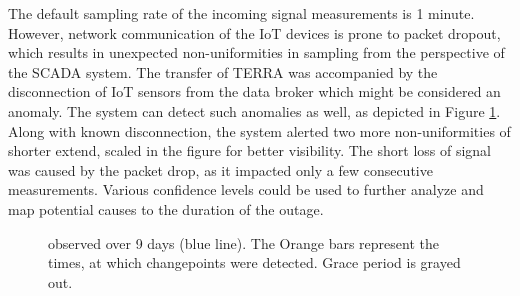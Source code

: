The default sampling rate of the incoming signal measurements is 1 minute. However, network communication of the IoT devices is prone to packet dropout, which results in unexpected non-uniformities in sampling from the perspective of the SCADA system. The transfer of TERRA was accompanied by the disconnection of IoT sensors from the data broker which might be considered an anomaly. The system can detect such anomalies as well, as depicted in Figure \ref{fig:terra_sampling}. Along with known disconnection, the system alerted two more non-uniformities of shorter extend, scaled in the figure for better visibility. The short loss of signal was caused by the packet drop, as it impacted only a few consecutive measurements. Various confidence levels could be used to further analyze and map potential causes to the duration of the outage.

\begin{figure}[htbp]
 \centering
 \caption{ observed over 9 days (blue line). The  Orange bars represent the times, at which changepoints were detected. Grace period is grayed out.}
 \label{fig:terra_sampling}
\end{figure}

